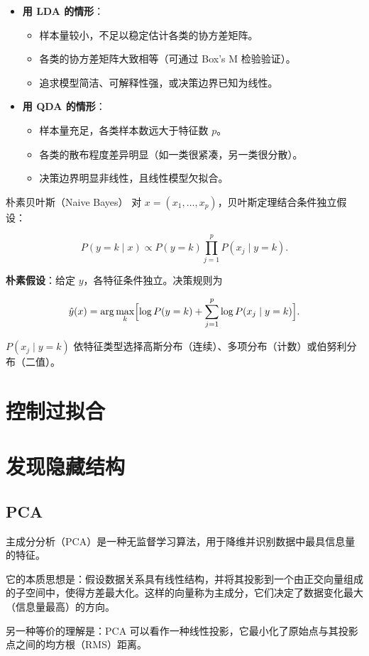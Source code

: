 \begin{itemize}
    \item \textbf{用 LDA 的情形}：
    \begin{itemize}
        \item 样本量较小，不足以稳定估计各类的协方差矩阵。
        \item 各类的协方差矩阵大致相等（可通过 Box's M 检验验证）。
        \item 追求模型简洁、可解释性强，或决策边界已知为线性。
    \end{itemize}
    \item \textbf{用 QDA 的情形}：
    \begin{itemize}
        \item 样本量充足，各类样本数远大于特征数 $p$。
        \item 各类的散布程度差异明显（如一类很紧凑，另一类很分散）。
        \item 决策边界明显非线性，且线性模型欠拟合。
    \end{itemize}
\end{itemize}
\begin{definition}{朴素贝叶斯（Naive Bayes）}
对 $x=(x_1,\dots,x_p)$，贝叶斯定理结合条件独立假设：

\[
P(y=k\mid x)\propto P(y=k)\prod_{j=1}^p P(x_j\mid y=k).
\]

\textbf{朴素假设}：给定 $y$，各特征条件独立。决策规则为

\[
\hat{y}(x)=\arg\max_k \Bigl[\log P(y=k)+\sum_{j=1}^p\log P(x_j\mid y=k)\Bigr].
\]

$P(x_j\mid y=k)$ 依特征类型选择高斯分布（连续）、多项分布（计数）或伯努利分布（二值）。
\end{definition}
\chapter{控制过拟合}
\chapter{发现隐藏结构}
\section{PCA}
\begin{definition}
主成分分析（PCA）是一种无监督学习算法，用于降维并识别数据中最具信息量的特征。

它的本质思想是：假设数据关系具有线性结构，并将其投影到一个由正交向量组成的子空间中，使得方差最大化。这样的向量称为主成分，它们决定了数据变化最大（信息量最高）的方向。

另一种等价的理解是：PCA 可以看作一种线性投影，它最小化了原始点与其投影点之间的均方根（RMS）距离。

\end{definition}

